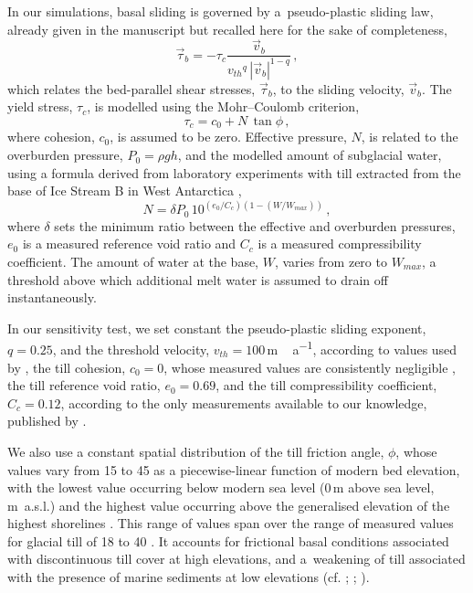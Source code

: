 In our simulations, basal sliding is governed by a~pseudo-plastic sliding law,
already given in the manuscript but recalled here for the sake of completeness,
%
\begin{equation}
    \label{eqn:pseudoplastic}
    \vec{\tau}_b = -\tau_c \frac{\vec{v}_b}{{v_{th}}^q\,|\vec{v}_b|^{1-q}} \,,
\end{equation}
%
which relates the bed-parallel shear stresses, $\vec{\tau}_b$, to the sliding
velocity, $\vec{v}_b$. The yield stress, $\tau_c$, is modelled using the
Mohr--Coulomb criterion,
%
\begin{equation}
   \tau_c = c_0 + N\,\tan{\phi} \,,
\end{equation}
%
where cohesion, $c_0$, is assumed to be zero. Effective pressure, $N$, is
related to the overburden pressure, $P_0=\rho gh$, and the modelled amount of
subglacial water, using a formula derived from laboratory experiments with till
extracted from the base of Ice Stream B in West Antarctica
\citep[Eqn.~23]{Tulaczyk.etal.2000, Bueler.Pelt.2015},
\begin{equation}
    \label{eqn:ntil}
    N = \delta P_0 \, 10^{(e_0/C_c) (1 - (W/W_{max}))} \,,
\end{equation}
where $\delta$ sets the minimum ratio between the effective and
overburden pressures, $e_0$ is a measured reference void ratio
and $C_c$ is a measured compressibility coefficient. The amount of water at the
base, $W$, varies from zero to $W_{max}$, a threshold above which additional
melt water is assumed to drain off instantaneously.

In our sensitivity test, we set constant the pseudo-plastic sliding exponent,
$q=0.25$, and the threshold velocity, $v_{th}=100$\,\unit{m\,a^{-1}}, according
to values used by \citet{Aschwanden.etal.2013}, the till cohesion, $c_0=0$,
whose measured values are consistently negligible
\citep[p.~268]{Tulaczyk.etal.2000, Cuffey.Paterson.2010}, the till reference
void ratio, $e_0=0.69$, and the till compressibility coefficient, $C_c=0.12$,
according to the only measurements available to our knowledge, published by
\citep{Tulaczyk.etal.2000}.

We also use a constant spatial distribution of the till friction angle, $\phi$,
whose values vary from 15 to 45{\degree} as a piecewise-linear function of
modern bed elevation, with the lowest value occurring below modern sea level
(0\,m above sea level, m~a.s.l.) and the highest value occurring above the
generalised elevation of the highest shorelines
\citep[200\,m~a.s.l.,][Fig.~5]{Clague.1981}. This range of values span over the
range of measured values for glacial till of 18 to 40{\degree}
\citep[p.~268]{Cuffey.Paterson.2010}. It accounts for frictional basal
conditions associated with discontinuous till cover at high elevations, and
a~weakening of till associated with the presence of marine sediments at low
elevations (cf. \citealp{Martin.etal.2011};
\citealp[supplement]{Aschwanden.etal.2013}; \citealp{PISM-authors.2015}).

